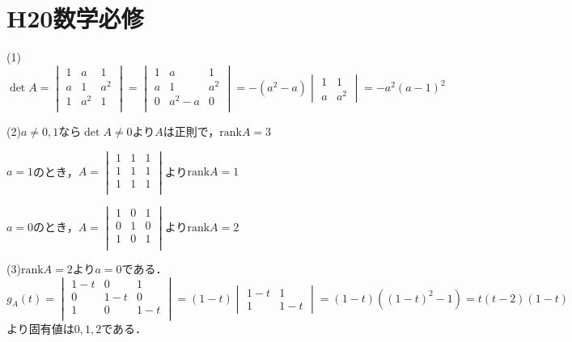 \documentclass[
		book,
		head_space=20mm,
		foot_space=20mm,
		gutter=10mm,
		line_length=190mm
]{jlreq}
\begin{document}
\section{H20数学必修}
(1)$\det A = \begin{vmatrix}
    1 & a & 1 \\
    a & 1 & a^2\\
    1 & a^2 & 1 \\
\end{vmatrix}=\begin{vmatrix}
    1 & a & 1 \\
    a & 1 & a^2\\
    0 & a^2-a & 0 \\
\end{vmatrix}=-(a^2-a)\begin{vmatrix}
    1 & 1\\
    a & a^2
\end{vmatrix}=-a^2(a-1)^2$

(2)$a\neq 0,1$なら$\det A \neq 0$より$A$は正則で，$\mathrm{rank}A = 3$

$a=1$のとき，$A=\begin{vmatrix}
    1 & 1 & 1 \\
    1 & 1 & 1\\
    1 & 1 & 1 \\
\end{vmatrix}$より$\mathrm{rank}A=1$

$a=0$のとき，$A=\begin{vmatrix}
    1 & 0 & 1 \\
    0 & 1 & 0\\
    1 & 0 & 1 \\
\end{vmatrix}$より$\mathrm{rank}A=2$

(3)$\mathrm{rank}A=2$より$a=0$である．
$g_A(t)=\begin{vmatrix}
    1-t & 0 & 1 \\
    0 & 1-t & 0\\
    1 & 0 & 1-t \\
\end{vmatrix}=(1-t)\begin{vmatrix}
    1-t & 1\\
    1 & 1-t 
\end{vmatrix}=(1-t)((1-t)^2-1)=t(t-2)(1-t)$より固有値は$0,1,2$である．
\end{document}
